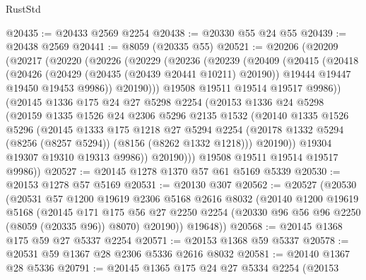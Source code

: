 \begin{lexlean}{RustStd}
\begin{coremodule}
{\begin{coremodule}
{{{{{{{{{{{{{{{{{{{{{{{{{{{{{{{{{{@20435 := @20433 @2569 @2254
@20438 := @20330 @55 @24 @55
@20439 := @20438 @2569
@20441 := @8059 (@20335 @55)
@20521 := @20206
    (@20209
      (@20217
        (@20220
          (@20226
            (@20229
              (@20236
                (@20239
                  (@20409
                    (@20415
                      (@20418
                        (@20426
                          (@20429 (@20435 (@20439 @20441 @10211) @20190))
                          @19444
                          @19447
                          @19450
                          @19453
                          @9986))
                      @20190)))
                @19508
                @19511
                @19514
                @19517
                @9986))
            (@20145
              @1336
              @175
              @24
              @27
              @5298
              @2254
              (@20153
                @1336
                @24
                @5298
                (@20159
                  @1335
                  @1526
                  @24
                  @2306
                  @5296
                  @2135
                  @1532
                  (@20140
                    @1335
                    @1526
                    @5296
                    (@20145
                      @1333
                      @175
                      @1218
                      @27
                      @5294
                      @2254
                      (@20178 @1332 @5294 (@8256 (@8257 @5294)) (@8156 (@8262 @1332 @1218)))
                      @20190))
                  @19304
                  @19307
                  @19310
                  @19313
                  @9986))
              @20190)))
        @19508
        @19511
        @19514
        @19517
        @9986))
@20527 := @20145 @1278 @1370 @57 @61 @5169 @5339
@20530 := @20153 @1278 @57 @5169
@20531 := @20130 @307
@20562 := @20527
    (@20530
      (@20531
        @57
        @1200
        @19619
        @2306
        @5168
        @2616
        @8032
        (@20140
          @1200
          @19619
          @5168
          (@20145
            @171
            @175
            @56
            @27
            @2250
            @2254
            (@20330 @96 @56 @96 @2250 (@8059 (@20335 @96)) @8070)
            @20190))
        @19648))
@20568 := @20145 @1368 @175 @59 @27 @5337 @2254
@20571 := @20153 @1368 @59 @5337
@20578 := @20531 @59 @1367 @28 @2306 @5336 @2616 @8032
@20581 := @20140 @1367 @28 @5336
@20791 := @20145
    @1365
    @175
    @24
    @27
    @5334
    @2254
    (@20153
}}}}}}}}}}}}}}}}}}}}}}}}}}}}}}}}}}
\end{coremodule}}
\end{coremodule}
\end{lexlean}
